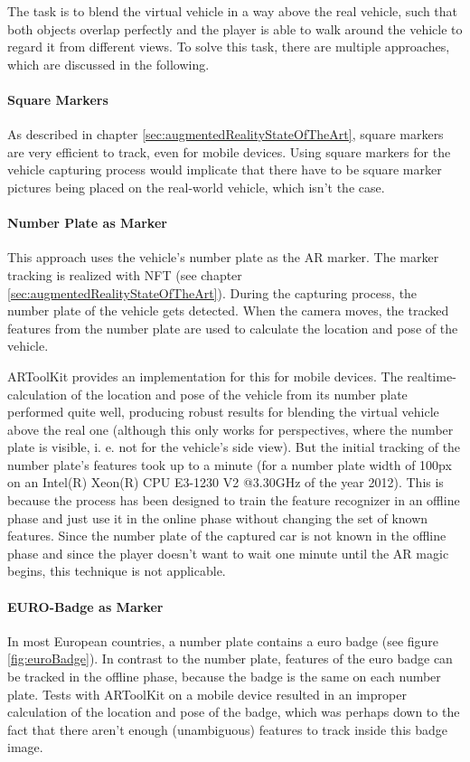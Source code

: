 The task is to blend the virtual vehicle in a way above the real vehicle, such that both objects overlap perfectly and the player is able to walk around the vehicle to regard it from different views. To solve this task, there are multiple approaches, which are discussed in the following.

\paragraph{Square Markers}
As described in chapter \ref{sec:augmentedRealityStateOfTheArt}, square markers are very efficient to track, even for mobile devices. Using square markers for the vehicle capturing process would implicate that there have to be square marker pictures being placed on the real-world vehicle, which isn't the case.

\paragraph{Number Plate as Marker}
This approach uses the vehicle's number plate as the AR marker. The marker tracking is realized with NFT (see chapter \ref{sec:augmentedRealityStateOfTheArt}). During the capturing process, the number plate of the vehicle gets detected. When the camera moves, the tracked features from the number plate are used to calculate the location and pose of the vehicle.

ARToolKit provides an implementation for this for mobile devices. The realtime-calculation of the location and pose of the vehicle from its number plate performed quite well, producing robust results for blending the virtual vehicle above the real one (although this only works for perspectives, where the number plate is visible, i. e. not for the vehicle's side view). But the initial tracking of the number plate's features took up to a minute (for a number plate width of 100px on an Intel(R) Xeon(R) CPU E3-1230 V2 @3.30GHz of the year 2012). This is because the process has been designed to train the feature recognizer in an offline phase and just use it in the online phase without changing the set of known features. Since the number plate of the captured car is not known in the offline phase and since the player doesn't want to wait one minute until the AR magic begins, this technique is not applicable.

\paragraph{EURO-Badge as Marker}
In most European countries, a number plate contains a euro badge (see figure \ref{fig:euroBadge}). In contrast to the number plate, features of the euro badge can be tracked in the offline phase, because the badge is the same on each number plate.
Tests with ARToolKit on a mobile device resulted in an improper calculation of the location and pose of the badge, which was perhaps down to the fact that there aren't enough (unambiguous) features to track inside this badge image.

